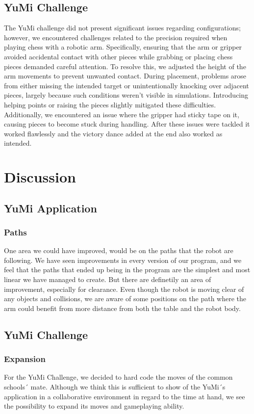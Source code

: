 \documentclass[a4paper,12pt]{article}
\begin{document}
\subsection{YuMi Challenge}
The YuMi challenge did not present significant issues regarding configurations; however, we encountered challenges related to the precision required when playing chess with a robotic arm. Specifically, ensuring that the arm or gripper avoided accidental contact with other pieces while grabbing or placing chess pieces demanded careful attention. To resolve this, we adjusted the height of the arm movements to prevent unwanted contact. During placement, problems arose from either missing the intended target or unintentionally knocking over adjacent pieces, largely because such conditions weren't visible in simulations. Introducing helping points or raising the pieces slightly mitigated these difficulties.
Additionally, we encountered an issue where the gripper had sticky tape on it, causing pieces to become stuck during handling. 
After these issues were tackled it worked flawlessly and the victory dance added at the end also worked as intended.

\section{Discussion}
\subsection{YuMi Application}
\subsubsection{Paths}
One area we could have improved, would be on the paths that the robot are following. We have seen improvements in every version of our program, and we feel that the paths that ended up being in the program are the simplest and most linear we have managed to create. But there are definetily an area of improvement, especially for clearance. Even though the robot is moving clear of any objects and collisions, we are aware of some positions on the path where the arm could benefit from more distance from both the table and the robot body.

\subsection{YuMi Challenge}
\subsubsection{Expansion}
For the YuMi Challenge, we decided to hard code the moves of the common schools´ mate. Although we think this is sufficient to show of the YuMi´s application in a collaborative environment in regard to the time at hand, we see the possibility to expand its moves and gameplaying ability. 
\end{document}
